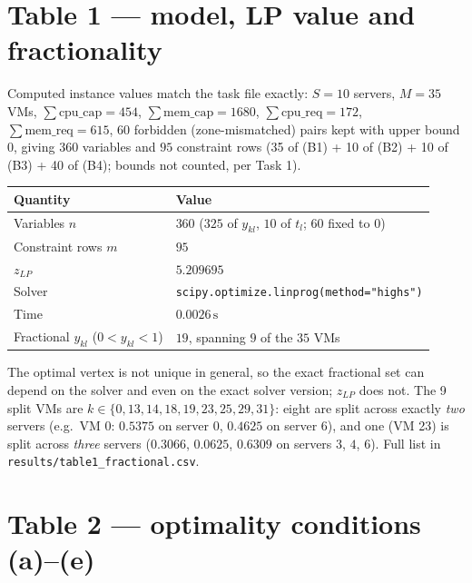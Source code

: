 \documentclass[11pt]{article}
\begin{document}
\section{Table 1 --- model, LP value and fractionality}

Computed instance values match the task file exactly: $S{=}10$ servers, $M{=}35$ VMs, $\sum
\text{cpu\_cap}{=}454$, $\sum\text{mem\_cap}{=}1680$, $\sum\text{cpu\_req}{=}172$,
$\sum\text{mem\_req}{=}615$, $60$ forbidden (zone-mismatched) pairs kept with upper bound $0$,
giving $360$ variables and $95$ constraint rows (35 of (B1) + 10 of (B2) + 10 of (B3) + 40 of
(B4); bounds not counted, per Task 1).

\begin{center}
\renewcommand{\arraystretch}{1.2}
\begin{tabular}{@{}ll@{}}
\toprule
Quantity & Value \\
\midrule
Variables $n$ & $360$ ($325$ of $y_{kl}$, $10$ of $t_l$; $60$ fixed to $0$) \\
Constraint rows $m$ & $95$ \\
$z_{LP}$ & $5.209695$ \\
Solver & \texttt{scipy.optimize.linprog(method="highs")} \\
Time & $0.0026\,\text{s}$ \\
Fractional $y_{kl}$ ($0<y_{kl}<1$) & $19$, spanning $9$ of the $35$ VMs \\
\bottomrule
\end{tabular}
\end{center}

\noindent The optimal vertex is not unique in general, so the exact fractional set can depend on
the solver and even on the exact solver version; $z_{LP}$ does not. The 9 split VMs are
$k\in\{0,13,14,18,19,23,25,29,31\}$: eight are split across exactly \emph{two} servers (e.g.\ VM
0: $0.5375$ on server 0, $0.4625$ on server 6), and one (VM 23) is split across \emph{three}
servers ($0.3066$, $0.0625$, $0.6309$ on servers $3$, $4$, $6$). Full list in
\texttt{results/table1\_fractional.csv}.

\section{Table 2 --- optimality conditions (a)--(e)}
\end{document}
